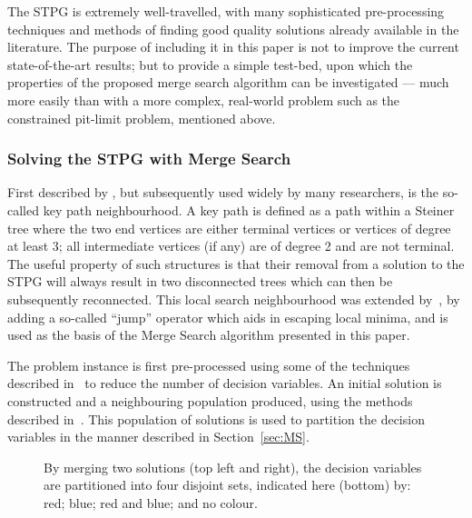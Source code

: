 \documentclass[authoryear,11pt,square,number,times,super,comma]{elsarticle}
\begin{document}
The STPG is extremely well-travelled, with many sophisticated pre-processing techniques and methods of finding good quality solutions already available in the literature. The purpose of including it in this paper is not to improve the current state-of-the-art results; but to provide a simple test-bed, upon which the properties of the proposed merge search algorithm can be investigated --- much more easily than with a more complex, real-world problem such as the constrained pit-limit problem, mentioned above.

\subsubsection{Solving the STPG with Merge Search}

First described by \cite{kp:dowsland}, but subsequently used widely by 
many researchers, is the so-called key path neighbourhood.
A key path is defined as a path within a Steiner tree where the two end vertices are
either terminal vertices or vertices of degree at least 3; all intermediate 
vertices (if any) are of degree 2 and are not terminal. The useful property of such
structures is that their removal from a solution to the STPG will always result in two disconnected
trees which can then be subsequently reconnected. This local search neighbourhood was extended by~\cite{Kenny:2016}, by adding a so-called ``jump'' operator which aids in escaping local minima, and is used as the basis of the Merge Search algorithm presented in this paper.

The problem instance is first pre-processed using some of the techniques described in~\citet{pp:duin,pp:uchoa,stpg-reduce} to reduce the number of decision variables. An initial solution is constructed and a neighbouring population produced, using the methods described in~\cite{Kenny:2016}. This population of solutions is used to partition the decision variables in the manner described in Section~\ref{sec:MS}.

\begin{figure}[h]
\centering
{}
    \caption[Partitioning variables by merging solutions]{By merging two solutions (top left and right), the decision variables are partitioned into four disjoint sets, indicated here (bottom) by: red; blue; red and blue; and no colour.}\label{fig:stpg-partition} 
\end{figure}
\end{document}
